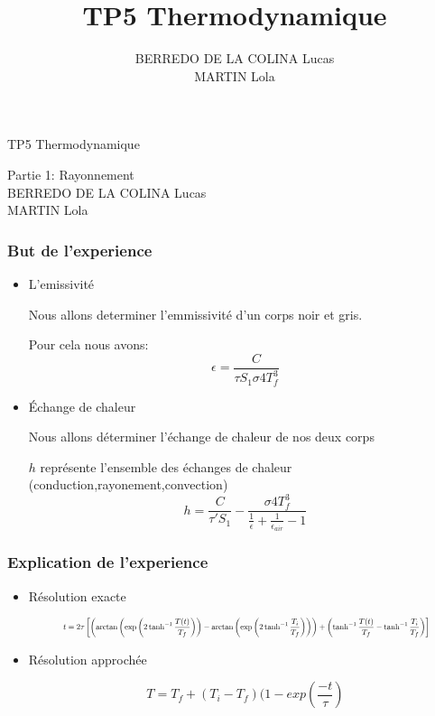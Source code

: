 \documentclass{beamer}
\title{TP5 Thermodynamique}
\author{BERREDO DE LA COLINA Lucas\\ MARTIN Lola}
\date{}
\begin{document}
\begin{frame}

\Huge{TP5 Thermodynamique}

\Large{Partie 1: Rayonnement}
\\[2em]
\large{BERREDO DE LA COLINA Lucas\\ MARTIN Lola}

\end{frame}





\begin{frame}
\frametitle{But de l'experience}

\begin{itemize}
	\item{L'emissivité}
    

    Nous allons determiner l'emmissivité d'un corps noir et gris.

    Pour cela nous avons:
    \[
    \epsilon = \frac{C}{\tau S_1 \sigma 4 T_f^3}
    \]

    \item{Échange de chaleur}

    
    Nous allons déterminer l'échange de chaleur de nos deux corps
    
    $h$ représente l'ensemble des échanges de chaleur (conduction,rayonement,convection)
    \[
    h= \frac{C}{\tau' S_1}-\frac{\sigma 4 T_f^3}{\frac{1}{\epsilon}+\frac{1}{\epsilon_{air}}-1}
    \]
    

    
    


    

\end{itemize}

\end{frame}





\begin{frame}
\frametitle{Explication de l'experience}

\begin{itemize}
La variation de Temperature obéit à l'équation diférencielle:

\[
C \frac{dT}{dt}=\epsilon S \sigma (T_f^4 - T(t)^4)
\]

    \item{Résolution exacte}
    
\[

\scalebox{0.62}{
$\displaystyle
t = 2\tau \left[
\left( \arctan\left( \exp\left( 2 \tanh^{-1} \frac{T(t)}{T_f} \right) \right)
- \arctan\left( \exp\left( 2 \tanh^{-1} \frac{T_i}{T_f} \right) \right) \right)
+ \left( \tanh^{-1} \frac{T(t)}{T_f} - \tanh^{-1} \frac{T_i}{T_f} \right)
\right]
$}

\]


    \item{Résolution approchée
    
\[T= T_f + (T_i - T_f) (1-exp(\frac{-t}{\tau})\] }
	
\end{itemize}

\end{frame}
\end{document}
